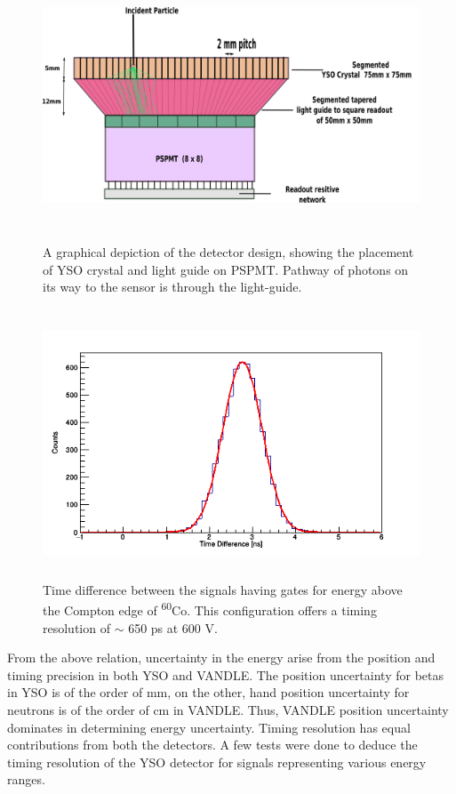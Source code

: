 \begin{figure}[h!]
	\centering
	\includegraphics[width=14cm,height=8cm]{figures/yso_lightguide.png}
	\caption[A graphical depiction of the detector design]{A graphical depiction of the detector design, showing the placement of YSO crystal and light guide on PSPMT. Pathway of photons on its way to the sensor is through the light-guide.}
	\label{fig:yso_riken_2018}
\end{figure}
\newpage
\begin{figure}[h!]
	\centering
	\includegraphics[width=12cm, height=8cm]{figures/YSO_timing.png}
	\caption[Time difference between the signals having gates]{Time difference between the signals having gates for energy above the Compton edge of \textsuperscript{60}Co. This configuration offers a timing resolution of $\sim$ 650 ps at 600 V. }
	\label{fig:time_resolution}
\end{figure}

From the above relation, uncertainty in the energy arise from the position and timing precision in both YSO and VANDLE. The position uncertainty for betas in YSO is of the order of mm, on the other, hand position uncertainty for neutrons is of the order of cm in VANDLE. Thus, VANDLE position uncertainty dominates in determining energy uncertainty. Timing resolution has equal contributions from both the detectors. A few tests were done to deduce the timing resolution of the YSO detector for signals representing various energy ranges. 

